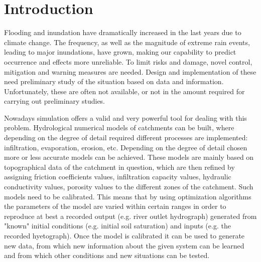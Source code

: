 \chapter{Introduction}
\label{chp:introduction}


\newcommand{\keyword}[1]{\textbf{#1}}
\newcommand{\tabhead}[1]{\textbf{#1}}
\newcommand{\code}[1]{\texttt{#1}}
\newcommand{\file}[1]{\texttt{\bfseries#1}}
\newcommand{\option}[1]{\texttt{\itshape#1}}


Flooding and inundation have dramatically increased in the last years due to climate change.
The frequency, as well as the magnitude of extreme rain events, leading to major inundations, have grown, making our capability to predict occurrence and effects more unreliable.
To limit risks and damage, novel control, mitigation and warning measures are needed.
Design and implementation of these need preliminary study of the situation based on data and information.
Unfortunately, these are often not available, or not in the amount required for carrying out preliminary studies.

Nowadays simulation offers a valid and very powerful tool for dealing with this problem.
Hydrological numerical models of catchments can be built, where depending on the degree of detail required different processes are implemented: infiltration, evaporation, erosion, etc.
Depending on the degree of detail chosen more or less accurate models can be achieved.
These models are mainly based on topographical data of the catchment in question, which are then refined by assigning friction coefficients values, infiltration capacity values, hydraulic conductivity values, porosity values to the different zones of the catchment.
Such models need to be calibrated.
This means that by using optimization algorithms the parameters of the model are varied within certain ranges in order to reproduce at best a recorded output (e.g. river outlet hydrograph) generated from "known" initial conditions (e.g. initial soil saturation) and inputs (e.g. the recorded hyetograph).
Once the model is calibrated it can be used to generate new data, from which new information about the given system can be learned and from which other conditions and new situations can be tested.

